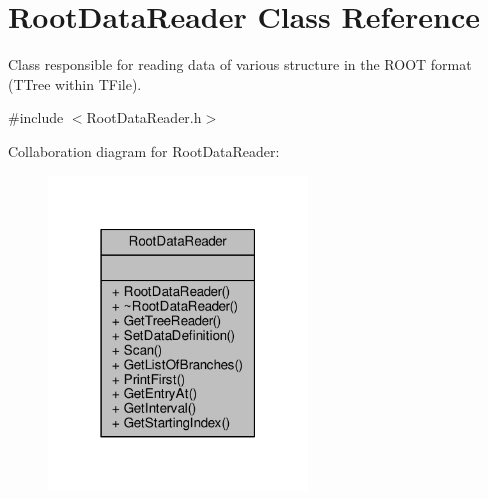 \hypertarget{classRootDataReader}{\section{Root\+Data\+Reader Class Reference}
\label{classRootDataReader}
}


Class responsible for reading data of various structure in the R\+O\+O\+T format (T\+Tree within T\+File).  




{\ttfamily \#include $<$Root\+Data\+Reader.\+h$>$}



Collaboration diagram for Root\+Data\+Reader\+:\nopagebreak
\begin{figure}[H]
\begin{center}
\leavevmode
\includegraphics[width=195pt]{classRootDataReader__coll__graph}
\end{center}
\end{figure}
